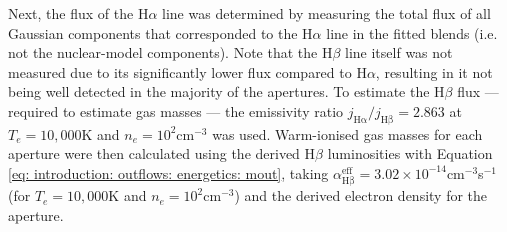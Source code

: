 Next, the flux of the H$\alpha$ line was determined by measuring the total flux of all Gaussian components that corresponded to the H$\alpha$ line in the fitted blends (i.e. not the nuclear-model components). Note that the H$\beta$ line itself was not measured due to its significantly lower flux compared to H$\alpha$, resulting in it not being well detected in the majority of the apertures. To estimate the H$\beta$ flux --- required to estimate gas masses --- the emissivity ratio $j_\mathrm{H\alpha}/j_\mathrm{H\beta}=2.863$ at $T_e=10,000$\;K and $n_e=10^2$\;cm$^{-3}$ \citep{Osterbrock2006} was used. Warm-ionised gas masses for each aperture were then calculated using the derived H$\beta$ luminosities with Equation \ref{eq: introduction: outflows: energetics: mout}, taking $\alpha^\mathrm{eff}_\mathrm{H\beta}=3.02\times10^{-14}$\;cm$^{-3}$\;s$^{-1}$ (for $T_e=10,000$\;K and $n_e=10^2$\;cm$^{-3}$) and the derived electron density for the aperture.

